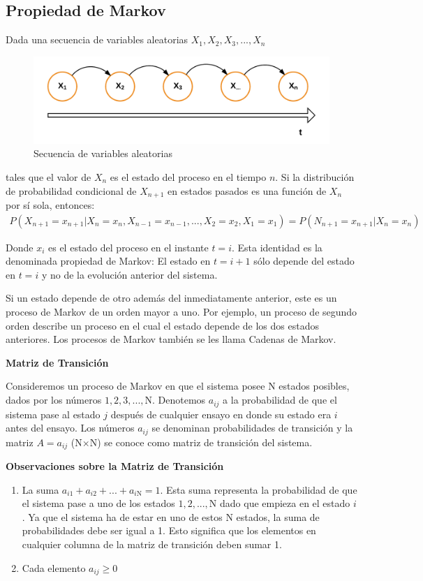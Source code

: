 \subsection{Propiedad de Markov}

Dada una secuencia de variables aleatorias $X_1, X_2, X_3, ... , X_n$

\begin{figure}[htp]
\centering
\includegraphics[scale=0.8]{images/va.png}
\caption{Secuencia de variables aleatorias}
\end{figure}

tales que el valor de $X_n$ es el estado del proceso en el tiempo $n$. Si la distribución de probabilidad condicional de $X_{n+1}$ en estados pasados es una función de $X_n$ por sí sola, entonces:
\begin{align*}
P(X_{n+1}=x_{n+1}|X_n=x_n, X_{n-1}=x_{n-1}, ... ,X_2=x_2, X_1=x_1)=P(N_{n+1}=x_{n+1}|X_n=x_n)     
\end{align*}

Donde $x_i$ es el estado del proceso en el instante $t=i$. Esta identidad es la denominada propiedad de Markov: El estado en $t=i+1$ sólo depende del estado en $t=i$ y no de la evolución anterior del sistema.

Si un estado depende de otro además del inmediatamente anterior, este es un proceso de Markov de un orden mayor a uno. Por ejemplo, un proceso de segundo orden describe un proceso en el cual el estado depende de los dos estados anteriores.
Los procesos de Markov también se les llama Cadenas de Markov.

\textbf{Matriz de Transición}

Consideremos un proceso de Markov en que el sistema posee N estados posibles, dados por los números $1, 2, 3, ... , \mathrm{N}$. Denotemos $a_{ij}$ a la probabilidad de que el sistema pase al estado $j$ después de cualquier ensayo en donde su estado era $i$ antes del ensayo. Los números $a_{ij}$ se denominan probabilidades de transición y la matriz $A={a_{ij}}$ (N$\times$N)  se conoce como matriz de transición del sistema.


\textbf{Observaciones sobre la Matriz de Transición}
\begin{enumerate}
\item La suma $a_{i1}+a_{i2}+...+a_{i\mathrm{N}}=1$. Esta suma representa la probabilidad de que el sistema pase a uno de los estados $1, 2, ... , \mathrm{N}$ dado que empieza en el estado $i$. Ya que el sistema ha de estar en uno de estos N estados, la suma de probabilidades debe ser igual a 1. Esto significa que los elementos en cualquier columna de la matriz de transición deben sumar 1.
\item Cada elemento $a_{ij} \geq 0$
\end{enumerate}


